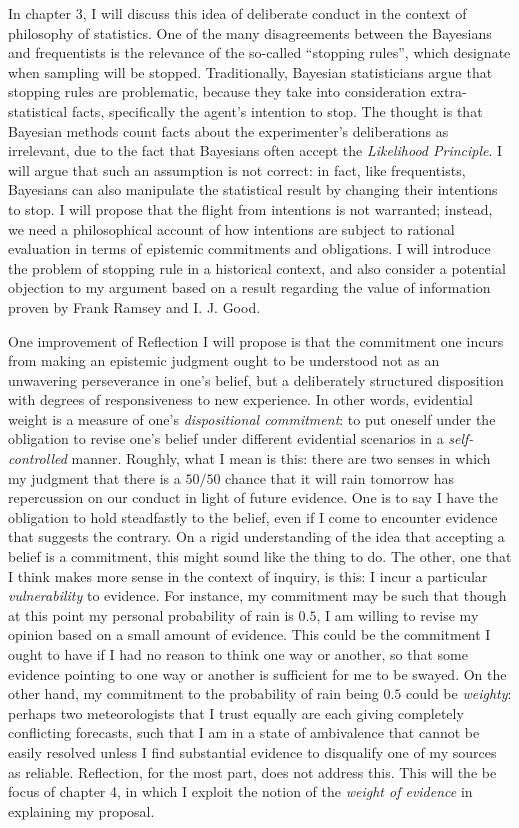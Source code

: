 In chapter 3, I will discuss this idea of deliberate conduct in the
context of philosophy of statistics. One of the many disagreements
between the Bayesians and frequentists is the relevance of the so-called
``stopping rules'', which designate when sampling will be stopped.
Traditionally, Bayesian statisticians argue that stopping rules are
problematic, because they take into consideration extra-statistical
facts, specifically the agent's intention to stop. The thought is
that Bayesian methods count facts about the
experimenter's deliberations as irrelevant, due to the fact that Bayesians often accept the \emph{Likelihood
Principle}. I will argue that such an assumption is not correct: in
fact, like frequentists, Bayesians can also manipulate the statistical
result by changing their intentions to stop. I will propose that the
flight from intentions is not warranted; instead, we need a
philosophical account of how intentions are subject to rational
evaluation in terms of epistemic commitments and obligations. I will
introduce the problem of stopping rule in a historical context, and also consider a potential
objection to my argument based on a result regarding the value of
information proven by Frank Ramsey and I. J. Good.

One improvement of Reflection I will propose is that the commitment one
incurs from making an epistemic judgment ought to be understood not as
an unwavering perseverance in one's belief, but a deliberately structured disposition with
degrees of responsiveness to new experience. In other words, evidential
weight is a measure of one's \emph{dispositional commitment}: to put
oneself under the obligation to revise one's belief under different
evidential scenarios in a \emph{self-controlled} manner. Roughly, what I
mean is this: there are two senses in which my judgment that there is
a \(50/50\) chance that it will rain tomorrow has repercussion on our conduct in light of future evidence. One
is to say I have the obligation to hold steadfastly to the belief, even
if I come to encounter evidence that suggests the contrary. On a rigid
understanding of the idea that accepting a belief is a commitment, this
might sound like the thing to do. The other, one that I think makes more
sense in the context of inquiry, is this: I incur a particular
\emph{vulnerability} to evidence. For instance, my commitment may be
such that though at this point my personal probability of rain is
\(0.5\), I am willing to revise my opinion based on a small amount of
evidence. This could be the commitment I ought to have if I had no reason to
think one way or another, so that some evidence pointing to one way or
another is sufficient for me to be swayed. On the other hand, my
commitment to the probability of rain being \(0.5\) could be
\emph{weighty}: perhaps two meteorologists that I trust equally are each
giving completely conflicting forecasts, such that I am in a state of
ambivalence that cannot be easily resolved unless I find substantial
evidence to disqualify one of my sources as reliable. Reflection, for
the most part, does not address this. This will the be focus of chapter
4, in which I exploit the notion of the \emph{weight of evidence} in
explaining my proposal.

